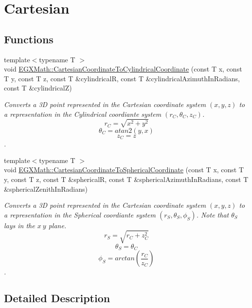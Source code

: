 \hypertarget{group___e_g_x_math-_conversions-_coordinate_conversions-3_d-_cartesian}{}\section{Cartesian}
\label{group___e_g_x_math-_conversions-_coordinate_conversions-3_d-_cartesian}
\subsection*{Functions}
\begin{DoxyCompactItemize}
\item 
{\footnotesize template$<$typename T $>$ }\\void \mbox{\hyperlink{group___e_g_x_math-_conversions-_coordinate_conversions-3_d-_cartesian_ga256f37d22da9bb58db556ee40dac8d81}{E\+G\+X\+Math\+::\+Cartesian\+Coordinate\+To\+Cylindrical\+Coordinate}} (const T x, const T y, const T z, const T \&cylindricalR, const T \&cylindrical\+Azimuth\+In\+Radians, const T \&cylindricalZ)
\begin{DoxyCompactList}\small\item\em Converts a 3D point represented in the Cartesian coordinate system $(x,y,z)$ to a representation in the Cylindrical coordiante system $(r_C,\theta_C,z_C)$. \[ r_C = \sqrt{x^2+y^2} \] \[ \theta_C = atan2(y,x) \] \[ z_C = z \]. \end{DoxyCompactList}\item 
{\footnotesize template$<$typename T $>$ }\\void \mbox{\hyperlink{group___e_g_x_math-_conversions-_coordinate_conversions-3_d-_cartesian_ga849c93ec135e9c72c5320c48eeacc7c9}{E\+G\+X\+Math\+::\+Cartesian\+Coordinate\+To\+Spherical\+Coordinate}} (const T x, const T y, const T z, const T \&sphericalR, const T \&spherical\+Azimuth\+In\+Radians, const T \&spherical\+Zenith\+In\+Radians)
\begin{DoxyCompactList}\small\item\em Converts a 3D point represented in the Cartesian coordinate system $(x,y,z)$ to a representation in the Spherical coordiante system $(r_S,\theta_S,\phi_S)$. Note that $\theta_S$ lays in the $x\ y$ plane. \[ r_S = \sqrt{r_C+z_C^2} \] \[ \theta_S = \theta_C \] \[ \phi_S = arctan(\frac{r_C}{z_C}) \]. \end{DoxyCompactList}\end{DoxyCompactItemize}


\subsection{Detailed Description}


